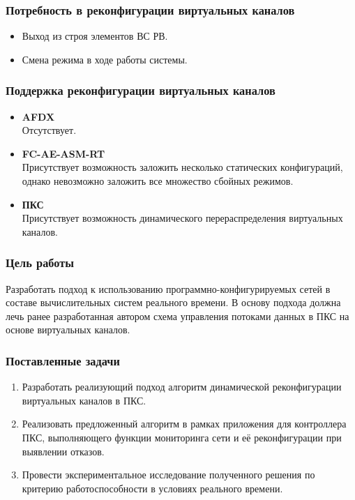 \documentclass[14pt, handout]{beamer}
\begin{document}
\begin{frame}
\frametitle{Потребность в реконфигурации виртуальных каналов}

\begin{itemize}
	\item Выход из строя элементов ВС РВ.
	\item Смена режима в ходе работы системы.
\end{itemize}

\end{frame}



\begin{frame}
\frametitle{Поддержка реконфигурации виртуальных каналов}

\begin{itemize}
	\item \textbf{AFDX} \\ Отсутствует.
	\item \textbf{FC-AE-ASM-RT} \\ Присутствует возможность заложить несколько статических конфигураций, однако невозможно заложить все множество сбойных режимов.
	\item \textbf{ПКС} \\ Присутствует возможность динамического перераспределения виртуальных каналов.
\end{itemize}

\end{frame}



\begin{frame}
\frametitle{Цель работы}
\begin{center}
	Разработать подход к использованию программно-конфигурируемых сетей в составе вычислительных систем реального времени. В основу подхода должна лечь ранее разработанная автором схема управления потоками данных в ПКС на основе виртуальных каналов.
\end{center}

\end{frame}



\begin{frame}
\frametitle{Поставленные задачи}

\begin{enumerate}
	\item Разработать реализующий подход алгоритм динамической реконфигурации виртуальных каналов в ПКС.
	\item Реализовать предложенный алгоритм в рамках приложения для контроллера ПКС, выполняющего функции мониторинга сети и её реконфигурации при выявлении отказов.
	\item Провести экспериментальное исследование полученного решения по критерию работоспособности в условиях реального времени.
\end{enumerate}

\end{frame}
\end{document}
